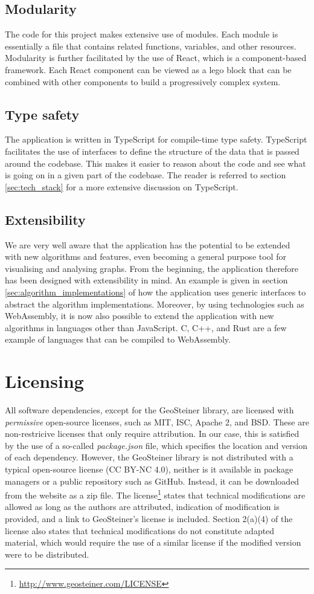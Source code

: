 \documentclass{l4proj}
\begin{document}
\subsection{Modularity}
The code for this project makes extensive use of modules. Each module is essentially a file that contains related functions, variables, and other resources.
Modularity is further facilitated by the use of React, which is a component-based framework. Each React component can be viewed as a lego block that can be combined with other components to build a progressively complex system.
\subsection{Type safety}
The application is written in TypeScript for compile-time type safety. TypeScript facilitates the use of interfaces to define the structure of the data that is passed around the codebase. This makes it easier to reason about the code and see what is going on in a given part of the codebase. The reader is referred to section \ref{sec:tech_stack} for a more extensive discussion on TypeScript.
\subsection{Extensibility}
We are very well aware that the application has the potential to be extended with new algorithms and features, even becoming a general purpose tool for visualising and analysing graphs. From the beginning, the application therefore has been designed with extensibility in mind. An example is given in section \ref{sec:algorithm_implementations} of how the application uses generic interfaces to abstract the algorithm implementations. Moreover, by using technologies such as WebAssembly, it is now also possible to extend the application with new algorithms in languages other than JavaScript. C, C++, and Rust are a few example of languages that can be compiled to WebAssembly.

\section{Licensing}
All software dependencies, except for the GeoSteiner library, are licensed with \textit{permissive} open-source licenses, such as MIT, ISC, Apache 2, and BSD. These are non-restricive licenses that only require attribution. In our case, this is satisfied by the use of a so-called \textit{package.json} file, which specifies the location and version of each dependency.
However, the GeoSteiner library is not distributed with a typical open-source license (CC BY-NC 4.0), neither is it available in package managers or a public repository such as GitHub. Instead, it can be downloaded from the website as a zip file.
The license\footnote{\url{http://www.geosteiner.com/LICENSE}} states that technical modifications are allowed as long as the authors are attributed, indication of modification is provided, and a link to GeoSteiner's license is included. Section 2(a)(4) of the license also states that technical modifications do not constitute adapted material, which would require the use of a similar license if the modified version were to be distributed.
\end{document}
